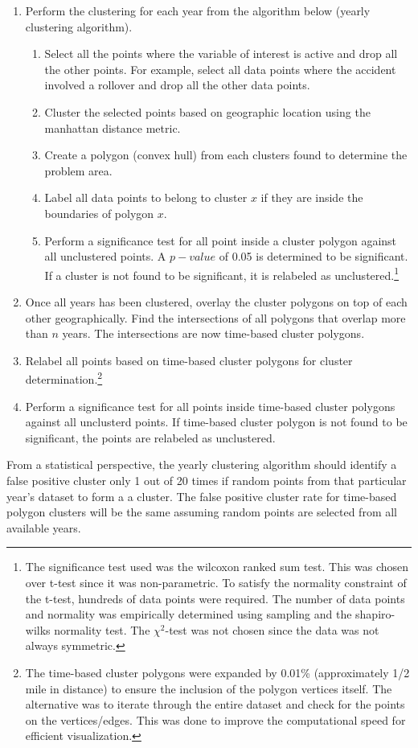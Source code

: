 \documentclass{article}
\begin{document}
\begin{enumerate}
	\item Perform the clustering for each year from the algorithm below (yearly clustering algorithm).
	\begin{enumerate}
			\item Select all the points where the variable of interest is active and drop all the other points. For example, select all data points where the accident involved a rollover and drop all the other data points.
			\item Cluster the selected points based on geographic location using the manhattan distance metric.
			\item Create a polygon (convex hull) from each clusters found to determine the problem area.
			\item Label all data points to belong to cluster $x$ if they are inside the boundaries of polygon $x$.
			\item Perform a significance test for all point inside a cluster polygon against all unclustered points. A $p-value$ of 0.05 is determined to be significant. If a cluster is not found to be significant, it is relabeled as unclustered.\footnote{The significance test used was the wilcoxon ranked sum test. This was chosen over t-test since it was non-parametric. To satisfy the normality constraint of the t-test, hundreds of data points were required. The number of data points and normality was empirically determined using sampling and the shapiro-wilks normality test. The $\chi^2$-test was not chosen since the data was not always symmetric.}
	\end{enumerate}
	\item Once all years has been clustered, overlay the cluster polygons on top of each other geographically. Find the intersections of all polygons that overlap more than $n$ years. The intersections are now time-based cluster polygons.
	\item Relabel all points based on time-based cluster polygons for cluster determination.\footnote{The time-based cluster polygons were expanded by 0.01\% (approximately 1/2 mile in distance) to ensure the inclusion of the polygon vertices itself. The alternative was to iterate through the entire dataset and check for the points on the vertices/edges. This was done to improve the computational speed for efficient visualization.}
	\item Perform a significance test for all points inside time-based cluster polygons against all unclusterd points. If time-based cluster polygon is not found to be significant, the points are relabeled as unclustered.
\end{enumerate}
From a statistical perspective, the yearly clustering algorithm should identify a false positive cluster only 1 out of 20 times if random points from that particular year's dataset to form a a cluster. The false positive cluster rate for time-based polygon clusters will be the same assuming random points are selected from all available years.
\end{document}
